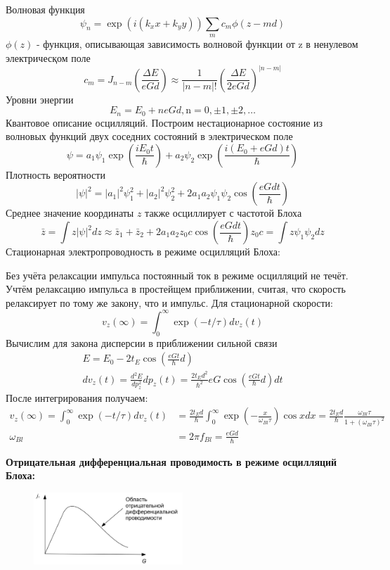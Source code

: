 Волновая функция
$$
\psi_n=\exp \left(i\left(k_x x+k_y y\right)\right) \sum_m c_m \phi(z-m d)
$$
$\phi(z)$ - функция, описывающая зависимость волновой функции от z в ненулевом электричесқом поле
$$
c_m=J_{n-m}\left(\frac{\Delta E}{e G d}\right) \approx \frac{1}{|n-m| !}\left(\frac{\Delta E}{2 e G d}\right)^{|n-m|}
$$
Уровни энергии
$$
E_n=E_0+n e G d, \mathrm{n}=0, \pm 1, \pm 2, \ldots
$$
Квантовое описание осцилляций. Построим нестационарное состояние из волновых функций двух соседних состояний в электрическом поле
$$
\psi=a_1 \psi_1 \exp \left(\frac{i E_0 t}{\hbar}\right)+a_2 \psi_2 \exp \left(\frac{i\left(E_0+e G d\right) t}{\hbar}\right)
$$
Плотность вероятности
$$
|\psi|^2=\left|a_1\right|^2 \psi_1^2+\left|a_2\right|^2 \psi_2^2+2 a_1 a_2 \psi_1 \psi_2 \cos \left(\frac{e G d t}{\hbar}\right)
$$
Среднее значение координаты $z$ также осциллирует с частотой Блоха
$$
\bar{z}=\int z|\psi|^2 d z \approx \bar{z}_1+\bar{z}_2+2 a_1 a_2 z_0 c \cos \left(\frac{e G d t}{\hbar}\right) z_0 c=\int z \psi_1 \psi_2 d z
$$
Стационарная электропроводность в режиме осцилляций Блоха:

Без учёта релаксации импульса постоянный ток в режиме осцилляций не течёт. Учтём релаксацию импульса в простейщем приближении, считая, что скорость релаксирует по тому же закону, что и импульс. Для стационарной скорости:
$$
v_z(\infty)=\int_0^{\infty} \exp (-t / \tau) d v_z(t)
$$
Вычислим для закона дисперсии в приближении сильной связи
$$
\begin{gathered}
E=E_0-2 t_E \cos \left(\frac{e G t}{\hbar} d\right) \\
d v_z(t)=\frac{d^2 E}{d p_z^2} d p_z(t)=\frac{2 t_E d^2}{\hbar^2} e G \cos \left(\frac{e G t}{\hbar} d\right) d t
\end{gathered}
$$
После интегрирования получаем:
$$
\begin{aligned}
v_z(\infty)=\int_0^{\infty} \exp (-t / \tau) d v_z(t) & =\frac{2 t_E d}{\hbar} \int_0^{\infty} \exp \left(-\frac{x}{\omega_{B l} \tau}\right) \cos x d x=\frac{2 t_E d}{\hbar} \frac{\omega_{B l} \tau}{1+\left(\omega_{B l} \tau\right)^2} \\
\omega_{B l} & =2 \pi f_{B l}=\frac{e G d}{\hbar}
\end{aligned}
$$

\textbf{Отрицательная дифференциальная проводимость в режиме
осцилляций Блоха:}
\begin{figure}[h!]
\centering
 \includegraphics[width=0.5\textwidth]{images/ph30.9.jpg}
\end{figure}

